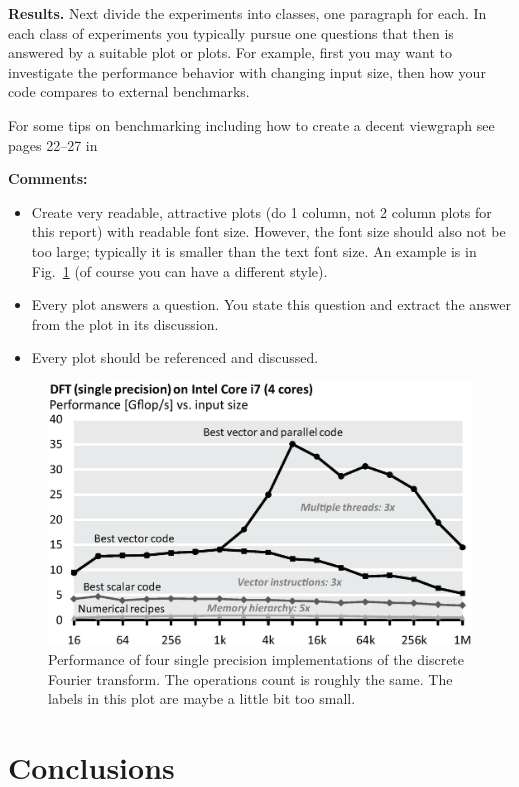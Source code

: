 \documentclass[letterpaper]{article}
\newcommand{\mypar}[1]{{\bf #1.}}
\begin{document}
\mypar{Results}
Next divide the experiments into classes, one paragraph for each. In each class of experiments you typically pursue one questions that then is answered by a suitable plot or plots. For example, first you may want to investigate the performance behavior with changing input size, then how your code compares to external benchmarks.

For some tips on benchmarking including how to create a decent viewgraph see pages 22--27 in

{\bf Comments:}
\begin{itemize}
\item Create very readable, attractive plots (do 1 column, not 2 column plots
for this report) with readable font size. However, the font size should also not be too large; typically it is smaller than the text font size.
An example is in Fig.~\ref{fftperf} (of course you can have a different style).
\item Every plot answers a question. You state this question and extract the
answer from the plot in its discussion.
\item Every plot should be referenced and discussed.
\end{itemize}

\begin{figure}\centering
  \includegraphics[scale=0.33]{dft-performance.eps}
  \caption{Performance of four single precision implementations of the
  discrete Fourier transform. The operations count is roughly the
  same. The labels in this plot are maybe a little bit too small.\label{fftperf}}
\end{figure}

\section{Conclusions}
\end{document}
